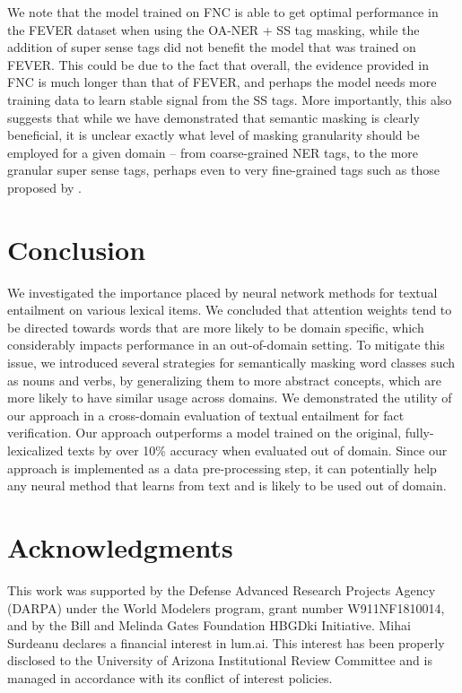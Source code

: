 We note that the model trained on FNC is able to get optimal performance in the FEVER dataset when using the OA-NER + SS tag masking, while the addition of super sense tags did not benefit the model that was trained on FEVER.
This could be due to the fact that overall, the evidence provided in FNC is much longer than that of FEVER,
and perhaps the model needs more training data to learn stable signal from the SS tags.
More importantly, this also suggests that while we have demonstrated that semantic masking is clearly beneficial, it is unclear exactly what level of masking granularity should be employed for a given domain -- from coarse-grained NER tags, to the more granular super sense tags, perhaps even to very fine-grained tags such as those proposed by \citet{ling2012fine}.

\section{Conclusion}

We investigated the importance placed by neural network methods for textual entailment on various lexical items. We concluded that attention weights tend to be directed towards words that are more likely to be domain specific, which
considerably impacts performance in an out-of-domain setting.
To mitigate this issue, we introduced several strategies for semantically masking word classes such as nouns and verbs, by generalizing them to more abstract concepts, which are more likely to have similar usage across domains.
We demonstrated the utility of our approach in a cross-domain evaluation of textual entailment for fact verification. Our approach outperforms a model trained on the original, fully-lexicalized texts by over 10\% accuracy when evaluated out of domain.
Since our approach is implemented as a data pre-processing step, it can potentially help any neural method that learns from text and is likely to be used out of domain.


\section*{Acknowledgments}

This work was supported by the Defense Advanced Research Projects Agency
(DARPA) under the World Modelers program, grant number
W911NF1810014, and by the Bill and Melinda
Gates Foundation HBGDki Initiative.
Mihai Surdeanu declares a financial interest in lum.ai. This interest has been properly disclosed to the University of Arizona Institutional Review Committee and is managed in accordance with its conflict of interest policies.

